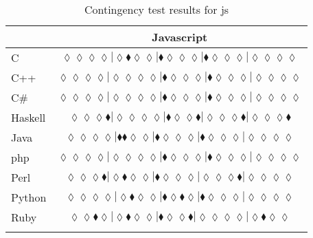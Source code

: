 \begin{table*}
\centering
\begin{tabular}{l c}
& Javascript \\
\hline

C & $\scriptscriptstyle\lozenge\lozenge\lozenge\lozenge|\lozenge\blacklozenge\lozenge\lozenge|\blacklozenge\lozenge\lozenge\lozenge|\blacklozenge\lozenge\lozenge\lozenge|\lozenge\lozenge\lozenge\lozenge$ \\
C++ & $\scriptscriptstyle\lozenge\lozenge\lozenge\lozenge|\lozenge\lozenge\lozenge\lozenge|\blacklozenge\lozenge\lozenge\lozenge|\blacklozenge\lozenge\lozenge\lozenge|\lozenge\lozenge\lozenge\lozenge$ \\
C\# & $\scriptscriptstyle\lozenge\lozenge\lozenge\lozenge|\lozenge\lozenge\lozenge\lozenge|\blacklozenge\lozenge\lozenge\lozenge|\blacklozenge\lozenge\lozenge\lozenge|\lozenge\lozenge\lozenge\lozenge$ \\
Haskell & $\scriptscriptstyle\lozenge\lozenge\lozenge\blacklozenge|\lozenge\lozenge\lozenge\lozenge|\blacklozenge\lozenge\lozenge\blacklozenge|\lozenge\lozenge\lozenge\blacklozenge|\lozenge\lozenge\lozenge\blacklozenge$ \\
Java & $\scriptscriptstyle\lozenge\lozenge\lozenge\lozenge|\blacklozenge\blacklozenge\lozenge\lozenge|\blacklozenge\lozenge\lozenge\lozenge|\blacklozenge\lozenge\lozenge\lozenge|\lozenge\lozenge\lozenge\lozenge$ \\
{\sc php} & $\scriptscriptstyle\lozenge\lozenge\lozenge\lozenge|\lozenge\lozenge\lozenge\lozenge|\blacklozenge\lozenge\lozenge\lozenge|\blacklozenge\lozenge\lozenge\lozenge|\lozenge\lozenge\lozenge\lozenge$ \\
Perl & $\scriptscriptstyle\lozenge\lozenge\lozenge\blacklozenge|\lozenge\blacklozenge\lozenge\lozenge|\blacklozenge\lozenge\lozenge\lozenge|\lozenge\lozenge\lozenge\blacklozenge|\lozenge\lozenge\lozenge\lozenge$ \\
Python & $\scriptscriptstyle\lozenge\lozenge\lozenge\lozenge|\lozenge\blacklozenge\lozenge\lozenge|\blacklozenge\lozenge\blacklozenge\lozenge|\blacklozenge\lozenge\lozenge\lozenge|\lozenge\lozenge\lozenge\lozenge$ \\
Ruby & $\scriptscriptstyle\lozenge\lozenge\blacklozenge\lozenge|\lozenge\blacklozenge\lozenge\lozenge|\blacklozenge\lozenge\lozenge\blacklozenge|\lozenge\lozenge\lozenge\lozenge|\lozenge\blacklozenge\lozenge\lozenge$ \\

\hline
& \\
\end{tabular}
\caption{Contingency test results for js}
\label{tbl:contingency-test-results-js}
\end{table*}



